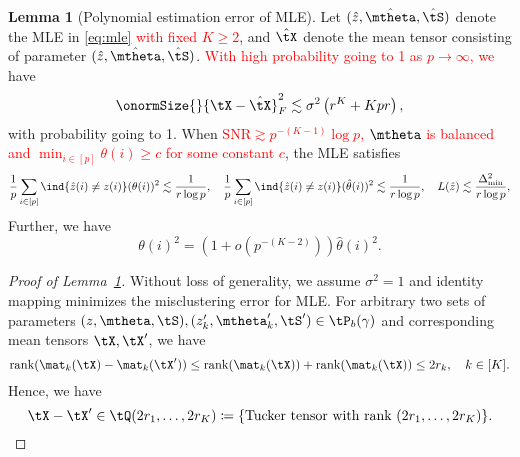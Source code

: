 \documentclass[lettersize,onecolumn,journal]{IEEEtran}
\theoremstyle{definition}
\newtheorem{lem}{Lemma}
\theoremstyle{definition}
\newcommand{\of}[1]{\left(#1\right)}
\begin{document}
{
\color{blue}

   
\begin{lem}[Polynomial estimation error of MLE]\label{lem:poly_mle_degree}  Let $(\hat z, \hat \mtheta, \hat \tS)$ denote the MLE in \eqref{eq:mle} \textcolor{red}{with fixed $K \geq 2$}, and $\hat \tX$ denote the mean tensor consisting of parameter $(\hat z, \hat \mtheta, \hat \tS)$. \textcolor{red}{With high probability going to 1 as $p \rightarrow \infty$, we} have 
\begin{equation}
    \onormSize{}{\tX - \hat \tX}_F^2 \lesssim \sigma^2 \of{ r^{K} + K p r},
\end{equation}
with probability going to 1. 
When \textcolor{red}{  $\text{SNR} \gtrsim p^{-(K-1)} \log p$,  $\mtheta$ is balanced and $\min_{i \in [p]} \theta(i) \geq c$ for some constant $c$}, the MLE satisfies
\begin{equation}
    \frac{1}{p} \sum_{i \in [p]} \ind\{ \hat z(i) \neq z(i) \} (\theta(i))^2 \lesssim \frac{1}{r \log p}, \quad \frac{1}{p} \sum_{i \in [p]} \ind\{ \hat z(i) \neq z(i) \} (\hat \theta(i))^2 \lesssim \frac{1}{r \log p} ,\quad   L(\hat z) \lesssim \frac{\Delta_{\min}^2}{r \log p},
\end{equation}
Further, we have 
\begin{equation}
     \theta(i)^2 = (1 + o(p^{-(K-2)})) \hat \theta(i)^2.
 \end{equation}
\end{lem}

\begin{proof}[Proof of Lemma~\ref{lem:poly_mle_degree}] Without loss of generality, we assume $\sigma^2 = 1$ and identity mapping minimizes the misclustering error for MLE.
For arbitrary two sets of parameters $(z, \mtheta, \tS), (z_k', \mtheta_k', \tS') \in \tP_b(\gamma)$ and corresponding mean tensors $\tX, \tX'$, we have 
\begin{equation}
    \text{rank}(\mat_k(\tX) - \mat_k(\tX')) \leq \text{rank}(\mat_k(\tX)) + \text{rank}(\mat_k(\tX)) \leq 2 r_k, \quad k \in [K].
\end{equation}
Hence, we have
\begin{equation}\label{eq:dtbm_tucker}
    \tX - \tX' \in \tQ(2r_1, \ldots, 2 r_K) \coloneqq \{ \text{Tucker tensor with rank }(2r_1, \ldots, 2 r_K) \}.
\end{equation}


\end{proof}}
\end{document}
